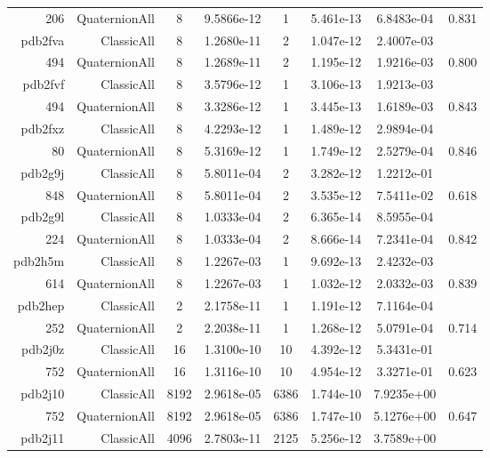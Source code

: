 \begin{xltabular}{\textwidth}{r|rcS[table-format=1.4e+2]cS[table-format=1.3e+2]S[table-format=1.4e+2]S[table-format=-1.3]}
206 & QuaternionAll & 8 & 9.5866e-12 & 1 & 5.461e-13 & 6.8483e-04 & 0.831\\  \addlinespace
pdb2fva & ClassicAll & 8 & 1.2680e-11 & 2 & 1.047e-12 & 2.4007e-03 & \\
494 & QuaternionAll & 8 & 1.2689e-11 & 2 & 1.195e-12 & 1.9216e-03 & 0.800\\  \addlinespace
pdb2fvf & ClassicAll & 8 & 3.5796e-12 & 1 & 3.106e-13 & 1.9213e-03 & \\
494 & QuaternionAll & 8 & 3.3286e-12 & 1 & 3.445e-13 & 1.6189e-03 & 0.843\\  \addlinespace
pdb2fxz & ClassicAll & 8 & 4.2293e-12 & 1 & 1.489e-12 & 2.9894e-04 & \\
80 & QuaternionAll & 8 & 5.3169e-12 & 1 & 1.749e-12 & 2.5279e-04 & 0.846\\  \addlinespace
{\color{red} pdb2g9j } & ClassicAll & 8 & 5.8011e-04 & 2 & 3.282e-12 & 1.2212e-01 & \\
848 & QuaternionAll & 8 & 5.8011e-04 & 2 & 3.535e-12 & 7.5411e-02 & 0.618\\  \addlinespace
pdb2g9l & ClassicAll & 8 & 1.0333e-04 & 2 & 6.365e-14 & 8.5955e-04 & \\
224 & QuaternionAll & 8 & 1.0333e-04 & 2 & 8.666e-14 & 7.2341e-04 & 0.842\\  \addlinespace
pdb2h5m & ClassicAll & 8 & 1.2267e-03 & 1 & 9.692e-13 & 2.4232e-03 & \\
614 & QuaternionAll & 8 & 1.2267e-03 & 1 & 1.032e-12 & 2.0332e-03 & 0.839\\  \addlinespace
pdb2hep & ClassicAll & 2 & 2.1758e-11 & 1 & 1.191e-12 & 7.1164e-04 & \\
252 & QuaternionAll & 2 & 2.2038e-11 & 1 & 1.268e-12 & 5.0791e-04 & 0.714\\  \addlinespace
{\color{red} pdb2j0z } & ClassicAll & 16 & 1.3100e-10 & 10 & 4.392e-12 & 5.3431e-01 & \\
752 & QuaternionAll & 16 & 1.3116e-10 & 10 & 4.954e-12 & 3.3271e-01 & 0.623\\  \addlinespace
{\color{red} pdb2j10 } & ClassicAll & 8192 & 2.9618e-05 & 6386 & 1.744e-10 & 7.9235e+00 & \\
752 & QuaternionAll & 8192 & 2.9618e-05 & 6386 & 1.747e-10 & 5.1276e+00 & 0.647\\  \addlinespace
{\color{red} pdb2j11 } & ClassicAll & 4096 & 2.7803e-11 & 2125 & 5.256e-12 & 3.7589e+00 & \\

\end{xltabular}
